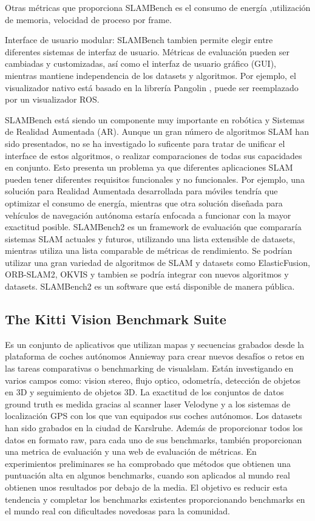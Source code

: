 Otras métricas que proporciona SLAMBench es el consumo de energía ,utilización de memoria, velocidad de proceso por frame.

Interface de usuario modular: SLAMBench tambien permite elegir entre diferentes sistemas de interfaz de usuario. Métricas de evaluación pueden ser cambiadas y customizadas, así como el interfaz de usuario gráfico (GUI), mientras mantiene independencia de los datasets y algoritmos. Por ejemplo, el visualizador nativo está basado en la librería Pangolin , puede ser reemplazado por un visualizador ROS.

SLAMBench está siendo un componente muy importante en robótica y Sistemas de Realidad Aumentada (AR). Aunque un gran número de algoritmos SLAM han sido presentados, no se ha investigado lo suficente para tratar de unificar el interface de estos algoritmos, o realizar comparaciones de todas sus capacidades en conjunto. Esto presenta un problema ya que diferentes aplicaciones SLAM pueden tener diferentes requisitos funcionales y no funcionales. Por ejemplo, una solución para Realidad Aumentada desarrollada para móviles tendría que optimizar el consumo de energía, mientras que otra solución diseñada para vehículos de navegación autónoma estaría enfocada a funcionar con la mayor exactitud posible. SLAMBench2 es un framework de evaluación que compararía sistemas SLAM actuales y futuros, utilizando una lista extensible de datasets, mientras utiliza una lista comparable de métricas de rendimiento. Se podrían utilizar una gran variedad de algoritmos de SLAM y datasets como ElasticFusion, ORB-SLAM2, OKVIS y tambien se podría integrar con nuevos algoritmos y datasets. SLAMBench2 es un software que está disponible de manera pública. 

\subsection{The Kitti Vision Benchmark Suite }

Es un conjunto de aplicativos que utilizan mapas y secuencias grabados desde la plataforma de coches autónomos Annieway para crear nuevos desafíos o retos en las tareas comparativas o benchmarking de visualslam.\cite{Geiger2012CVPR}
Están investigando en varios campos como: vision stereo, flujo optico, odometría, detección de objetos en 3D y seguimiento de objetos 3D.
La exactitud de los conjuntos de datos ground truth es medida gracias al scanner laser Velodyne y a los sistemas de localización GPS con los que van equipados sus coches autónomos.
Los datasets han sido grabados en la ciudad de Karslruhe.
Además de proporcionar todos los datos en formato raw, para cada uno de sus benchmarks, también proporcionan una metrica de evaluación y una web de evaluación de métricas. En experimientos preliminares se ha comprobado que métodos que obtienen una puntuación alta en algunos benchmarks, cuando son aplicados al mundo real obtienen unos resultados por debajo de la media. El objetivo es reducir esta tendencia y completar los benchmarks existentes proporcionando benchmarks en el mundo real con dificultades novedosas para la comunidad. 

